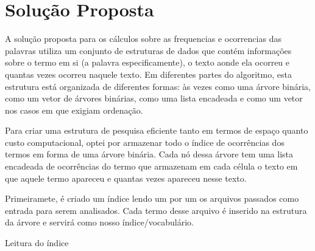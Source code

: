 \documentclass[12pt]{article}
\begin{document}
\section{Solução Proposta}
\label{solucao_proposta}


A solução proposta para os cálculos sobre as frequencias e ocorrencias das
palavras utiliza um conjunto de estruturas de dados que contém informações sobre
o termo em si (a palavra especificamente), o texto aonde ela ocorreu e quantas
vezes ocorreu naquele texto. Em diferentes partes do algoritmo, esta estrutura está
organizada de diferentes formas: às vezes como uma árvore binária, como um vetor
de árvores binárias, como uma lista encadeada e como um vetor nos casos em que
exigiam ordenação.

Para criar uma estrutura de pesquisa eficiente tanto em termos de espaço quanto
custo computacional, optei por armazenar todo o índice de ocorrências dos termos
em forma de uma árvore binária. Cada nó dessa árvore tem uma lista encadeada de
ocorrências do termo que armazenam em cada célula o texto em que aquele termo
apareceu e quantas vezes apareceu nesse texto.

Primeiramete, é criado um índice lendo um por um os arquivos passados como
entrada para serem analisados. Cada termo desse arquivo é inserido na estrutura
da árvore e servirá como nosso índice/vocabulário.

\begin{algorithm}[h!]
\begin{footnotesize}
\caption{Leitura do índice}
\end{footnotesize}
\end{algorithm}
\end{document}

